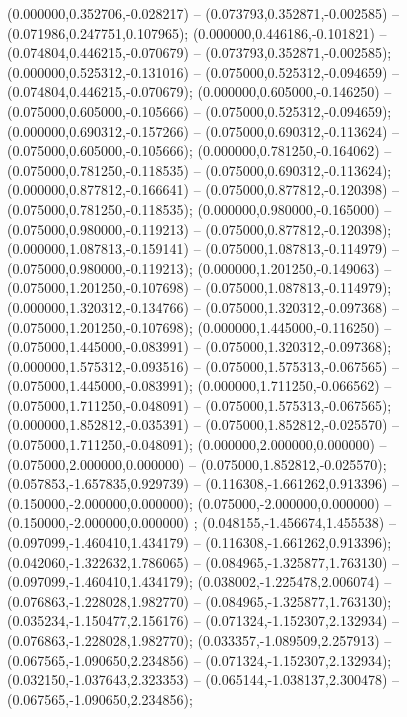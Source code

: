  (0.000000,0.352706,-0.028217) -- (0.073793,0.352871,-0.002585) -- (0.071986,0.247751,0.107965);
 (0.000000,0.446186,-0.101821) -- (0.074804,0.446215,-0.070679) -- (0.073793,0.352871,-0.002585);
 (0.000000,0.525312,-0.131016) -- (0.075000,0.525312,-0.094659) -- (0.074804,0.446215,-0.070679);
 (0.000000,0.605000,-0.146250) -- (0.075000,0.605000,-0.105666) -- (0.075000,0.525312,-0.094659);
 (0.000000,0.690312,-0.157266) -- (0.075000,0.690312,-0.113624) -- (0.075000,0.605000,-0.105666);
 (0.000000,0.781250,-0.164062) -- (0.075000,0.781250,-0.118535) -- (0.075000,0.690312,-0.113624);
 (0.000000,0.877812,-0.166641) -- (0.075000,0.877812,-0.120398) -- (0.075000,0.781250,-0.118535);
 (0.000000,0.980000,-0.165000) -- (0.075000,0.980000,-0.119213) -- (0.075000,0.877812,-0.120398);
 (0.000000,1.087813,-0.159141) -- (0.075000,1.087813,-0.114979) -- (0.075000,0.980000,-0.119213);
 (0.000000,1.201250,-0.149063) -- (0.075000,1.201250,-0.107698) -- (0.075000,1.087813,-0.114979);
 (0.000000,1.320312,-0.134766) -- (0.075000,1.320312,-0.097368) -- (0.075000,1.201250,-0.107698);
 (0.000000,1.445000,-0.116250) -- (0.075000,1.445000,-0.083991) -- (0.075000,1.320312,-0.097368);
 (0.000000,1.575312,-0.093516) -- (0.075000,1.575313,-0.067565) -- (0.075000,1.445000,-0.083991);
 (0.000000,1.711250,-0.066562) -- (0.075000,1.711250,-0.048091) -- (0.075000,1.575313,-0.067565);
 (0.000000,1.852812,-0.035391) -- (0.075000,1.852812,-0.025570) -- (0.075000,1.711250,-0.048091);
 (0.000000,2.000000,0.000000) -- (0.075000,2.000000,0.000000) -- (0.075000,1.852812,-0.025570);
 (0.057853,-1.657835,0.929739) -- (0.116308,-1.661262,0.913396) -- (0.150000,-2.000000,0.000000);
 (0.075000,-2.000000,0.000000) -- (0.150000,-2.000000,0.000000) ;
 (0.048155,-1.456674,1.455538) -- (0.097099,-1.460410,1.434179) -- (0.116308,-1.661262,0.913396);
 (0.042060,-1.322632,1.786065) -- (0.084965,-1.325877,1.763130) -- (0.097099,-1.460410,1.434179);
 (0.038002,-1.225478,2.006074) -- (0.076863,-1.228028,1.982770) -- (0.084965,-1.325877,1.763130);
 (0.035234,-1.150477,2.156176) -- (0.071324,-1.152307,2.132934) -- (0.076863,-1.228028,1.982770);
 (0.033357,-1.089509,2.257913) -- (0.067565,-1.090650,2.234856) -- (0.071324,-1.152307,2.132934);
 (0.032150,-1.037643,2.323353) -- (0.065144,-1.038137,2.300478) -- (0.067565,-1.090650,2.234856);
